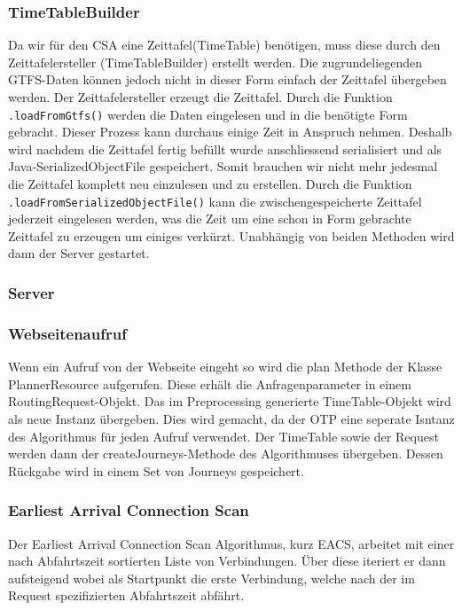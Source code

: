 \subsubsection{TimeTableBuilder}
Da wir für den CSA eine Zeittafel(TimeTable) benötigen, muss diese durch den Zeittafelersteller (TimeTableBuilder) erstellt werden. Die zugrundeliegenden GTFS-Daten können jedoch nicht in dieser Form einfach der Zeittafel übergeben werden. Der Zeittafelersteller erzeugt die Zeittafel. Durch die Funktion \texttt{.loadFromGtfs()} werden die Daten eingelesen und in die benötigte Form gebracht. Dieser Prozess kann durchaus einige Zeit in Anspruch nehmen. Deshalb wird nachdem die Zeittafel fertig befüllt wurde anschliessend serialisiert und als Java-SerializedObjectFile gespeichert. Somit brauchen wir nicht mehr jedesmal die Zeittafel komplett neu einzulesen und zu erstellen. Durch die Funktion \texttt{.loadFromSerializedObjectFile()} kann die zwischengespeicherte Zeittafel jederzeit eingelesen werden, was die Zeit um eine schon in Form gebrachte Zeittafel zu erzeugen um einiges verkürzt. Unabhängig von beiden Methoden wird dann der Server gestartet.

\subsubsection{Server}
\subsubsection{Webseitenaufruf}
Wenn ein Aufruf von der Webseite eingeht so wird die plan Methode der Klasse PlannerResource aufgerufen. Diese erhält die Anfragenparameter in einem RoutingRequest-Objekt. Das im Preprocessing generierte TimeTable-Objekt wird als neue Instanz übergeben. Dies wird gemacht, da der OTP eine seperate Isntanz des Algorithmus für jeden Aufruf verwendet. Der TimeTable sowie der Request werden dann der createJourneys-Methode des Algorithmuses übergeben. Dessen Rückgabe wird in einem Set von Journeys gespeichert.


\subsubsection{Earliest Arrival Connection Scan}
Der Earliest Arrival Connection Scan Algorithmus, kurz EACS, arbeitet mit einer nach Abfahrtszeit sortierten Liste von Verbindungen. Über diese iteriert er dann aufsteigend wobei als Startpunkt die erste Verbindung, welche nach der im Request spezifizierten Abfahrtszeit abfährt. 

